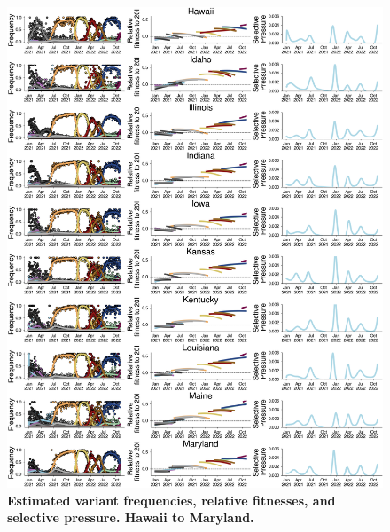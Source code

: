 \documentclass[11pt,oneside,letterpaper]{article}
\begin{document}
\begin{figure}[t!]
    \centering
    \includegraphics[width=1.0\textwidth=0.01]{./supplementary_figures/selective-pressure-analysis_group_2.png}
    \caption{
        \textbf{Estimated variant frequencies, relative fitnesses, and selective pressure. Hawaii to Maryland.}
    }
    \label{fig:selective_pressure_group_2}
\end{figure}
\end{document}
